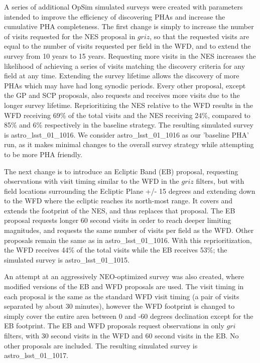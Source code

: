 A series of additional OpSim simulated surveys were created with parameters intended to improve the efficiency of discovering PHAs and increase the cumulative PHA completeness. The first change is simply to increase the number of visits requested for the NES proposal in $griz$, so that the requested visits are equal to the number of visits requested per field in the WFD, and to extend the survey from 10 years to 15 years. Requesting more visits in the NES increases the likelihood of achieving a series of visits matching the discovery criteria for any field at any time. Extending the survey lifetime allows the discovery of more PHAs which may have had long synodic periods. Every other proposal, except the GP and SCP proposals, also requests and receives more visits due to the longer survey lifetime. Reprioritizing the NES relative to the WFD results in the WFD receiving 69\% of the total visits and the NES receiving 24\%, compared to 85\% and 6\% respectively in the baseline strategy. The resulting simulated survey is astro\_lsst\_01\_1016.  We consider astro\_lsst\_01\_1016 as our 'baseline PHA' run, as it makes minimal changes to the overall survey strategy while attempting to be more PHA friendly. 

The next change is to introduce an Ecliptic Band (EB) proposal, requesting observations with visit timing similar to the WFD in the $griz$ filters, but with field locations surrounding the Ecliptic Plane +/- 15 degrees and extending down to the WFD where the ecliptic reaches its north-most range. It covers and extends the footprint of the NES, and thus replaces that proposal. The EB proposal requests longer 60 second visits in order to reach deeper limiting magnitudes, and requests the same number of visits per field as the WFD. Other proposals remain the same as in astro\_lsst\_01\_1016. With this reprioritization, the WFD receives 44\% of the total visits while the EB receives 53\%; the simulated survey is astro\_lsst\_01\_1015. 

An attempt at an aggressively NEO-optimized survey was also created, where modified versions of the EB and WFD proposals are used. The visit timing in each proposal is the same as the standard WFD visit timing (a pair of visits separated by about 30 minutes), however the WFD footprint is changed to simply cover the entire area between 0 and -60 degrees declination except for the EB footprint. The EB and WFD proposals request observations in only $gri$ filters, with 30 second visits in the WFD and 60 second visits in the EB. No other proposals are included. The resulting simulated survey is astro\_lsst\_01\_1017. 

